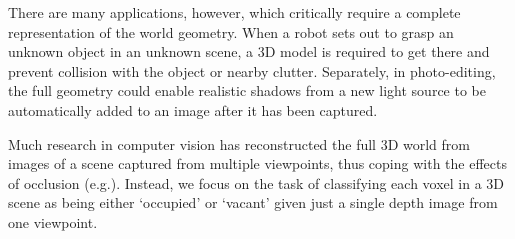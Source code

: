 \documentclass[10pt,twocolumn,letterpaper]{article}
\makeatletter
\renewcommand*{\eg}{e.g.\@\xspace}
\makeatother
\begin{document}
There are many applications, however, which critically require a complete representation of the world geometry.
When a robot sets out to grasp an unknown object in an unknown scene, a 3D model is required to get there and prevent collision with the object or nearby clutter.
Separately, in photo-editing, the full geometry could enable realistic shadows from a new light source to be automatically added to an image after it has been captured.

Much research in computer vision has reconstructed the full 3D world from images of a scene captured from multiple viewpoints, thus coping with the effects of occlusion  (\eg \cite{izadi-uist-2011}).
Instead, we focus on the task of classifying each voxel in a 3D scene as being either `occupied' or `vacant' given just a single depth image from one viewpoint.
\end{document}
